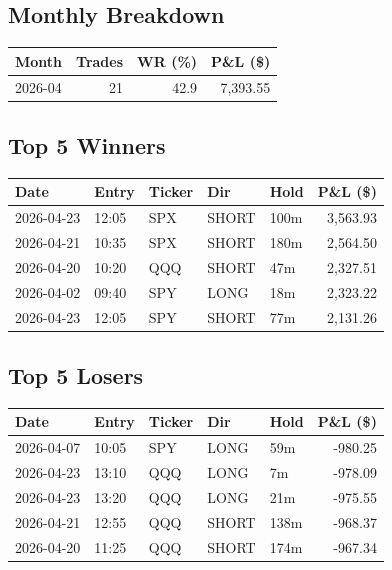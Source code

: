 \documentclass[11pt,a4paper,twoside]{article}
\begin{document}
\subsection{Monthly Breakdown}
\noindent\begin{center}
\begin{tabular}{>{\color{txtmain}}l rrr}
\toprule
\rowcolor{cardbg}
\textbf{Month} & \textbf{Trades} & \textbf{WR (\%)} & \textbf{P\&L (\$)} \\
\midrule
2026-04 & 21 & 42.9 & \textcolor{wingreen}{7,393.55} \\
\bottomrule
\end{tabular}
\end{center}
\subsection{Top 5 Winners}
\noindent\begin{center}
\begin{tabular}{>{\color{txtmain}}l llll r}
\toprule
\rowcolor{cardbg}
\textbf{Date} & \textbf{Entry} & \textbf{Ticker} & \textbf{Dir} & \textbf{Hold} & \textbf{P\&L (\$)} \\
\midrule
2026-04-23 & 12:05 & SPX & SHORT & 100m & \textcolor{wingreen}{3,563.93} \\
2026-04-21 & 10:35 & SPX & SHORT & 180m & \textcolor{wingreen}{2,564.50} \\
2026-04-20 & 10:20 & QQQ & SHORT & 47m & \textcolor{wingreen}{2,327.51} \\
2026-04-02 & 09:40 & SPY & LONG & 18m & \textcolor{wingreen}{2,323.22} \\
2026-04-23 & 12:05 & SPY & SHORT & 77m & \textcolor{wingreen}{2,131.26} \\
\bottomrule
\end{tabular}
\end{center}
\subsection{Top 5 Losers}
\noindent\begin{center}
\begin{tabular}{>{\color{txtmain}}l llll r}
\toprule
\rowcolor{cardbg}
\textbf{Date} & \textbf{Entry} & \textbf{Ticker} & \textbf{Dir} & \textbf{Hold} & \textbf{P\&L (\$)} \\
\midrule
2026-04-07 & 10:05 & SPY & LONG & 59m & \textcolor{lossred}{-980.25} \\
2026-04-23 & 13:10 & QQQ & LONG & 7m & \textcolor{lossred}{-978.09} \\
2026-04-23 & 13:20 & QQQ & LONG & 21m & \textcolor{lossred}{-975.55} \\
2026-04-21 & 12:55 & QQQ & SHORT & 138m & \textcolor{lossred}{-968.37} \\
2026-04-20 & 11:25 & QQQ & SHORT & 174m & \textcolor{lossred}{-967.34} \\
\bottomrule
\end{tabular}
\end{center}
\clearpage
\end{document}

